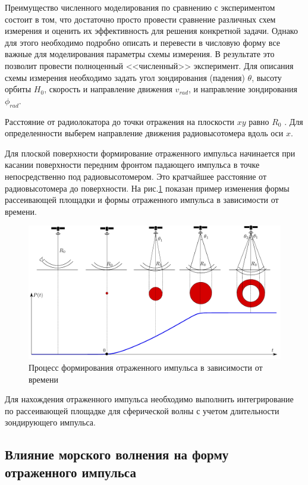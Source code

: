 Преимущество численного моделирования по сравнению с экспериментом состоит в
том, что достаточно просто провести сравнение различных схем измерения и
оценить их эффективность для решения конкретной задачи. Однако для этого
необходимо подробно описать и перевести в числовую форму все важные для
моделирования параметры схемы измерения. В результате это позволит провести
полноценный <<численный>> эксперимент.  Для описания схемы измерения необходимо
задать угол зондирования (падения) $\theta$, высоту орбиты $H_0$, скорость и
направление движения $v_{rad}$, и направление зондирования $\phi_{rad}$. 

Расстояние от радиолокатора до точки отражения на плоскости $xy$ равно $R_0$ .
Для определенности выберем направление движения радиовысотомера вдоль оси $x$.


Для плоской поверхности формирование отраженного импульса начинается при
касании поверхности передним фронтом падающего импульса в точке непосредственно
под радиовысотомером. Это кратчайшее расстояние от радиовысотомера до
поверхности. На рис.\ref{fig:wave_form} показан пример изменения формы
рассеивающей площадки и формы отраженного импульса в зависимости от времени.
\begin{figure}[h]
    \centering
    \includegraphics[]{fig/flat_wave1.pdf}
    \caption{Процесс формирования отраженного импульса в зависимости от времени}
    \label{fig:wave_form}
\end{figure}

Для нахождения отраженного импульса необходимо выполнить интегрирование по
рассеивающей площадке для сферической волны с учетом длительности зондирующего
импульса.


\subsection{Влияние морского волнения на форму отраженного импульса}%
\label{sub:vliianie_morskogo_volneniia_na_vormu_otrazhennogo_impul_sa}

